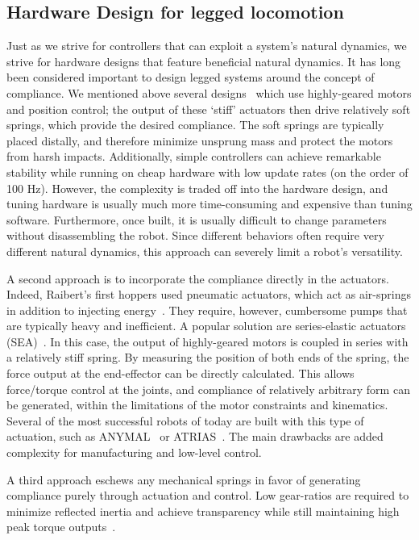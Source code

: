\subsection{Hardware Design for legged locomotion}

Just as we strive for controllers that can exploit a system's natural dynamics, we strive for hardware designs that feature beneficial natural dynamics.
It has long been considered important to design legged systems around the concept of compliance.
We mentioned above several designs~\cite{sprowitz2013towards,buchli2006resonance,altendorfer2001rhex,owaki2013simple} which use highly-geared motors and position control; the output of these `stiff' actuators then drive relatively soft springs, which provide the desired compliance. The soft springs are typically placed distally, and therefore minimize unsprung mass and protect the motors from harsh impacts. Additionally, simple controllers can achieve remarkable stability while running on cheap hardware with low update rates (on the order of 100 Hz). However, the complexity is traded off into the hardware design, and tuning hardware is usually much more time-consuming and expensive than tuning software. Furthermore, once built, it is usually difficult to change parameters without disassembling the robot. Since different behaviors often require very different natural dynamics, this approach can severely limit a robot's versatility. \par
A second approach is to incorporate the compliance directly in the actuators. Indeed, Raibert's first hoppers used pneumatic actuators, which act as air-springs in addition to injecting energy~\cite{raibert1986legged}. They require, however, cumbersome pumps that are typically heavy and inefficient.
A popular solution are series-elastic actuators (SEA)~\cite{pratt1995series}. In this case, the output of highly-geared motors is coupled in series with a relatively stiff spring. By measuring the position of both ends of the spring, the force output at the end-effector can be directly calculated. This allows force/torque control at the joints, and compliance of relatively arbitrary form can be generated, within the limitations of the motor constraints and kinematics. Several of the most successful robots of today are built with this type of actuation, such as ANYMAL~\cite{hutter2016anymal} or ATRIAS~\cite{hubicki2016atrias}. The main drawbacks are added complexity for manufacturing and low-level control.
\par
A third approach eschews any mechanical springs in favor of generating compliance purely through actuation and control. Low gear-ratios are required to minimize reflected inertia and achieve transparency while still maintaining high peak torque outputs~\cite{Seok2012proprioceptive}.
